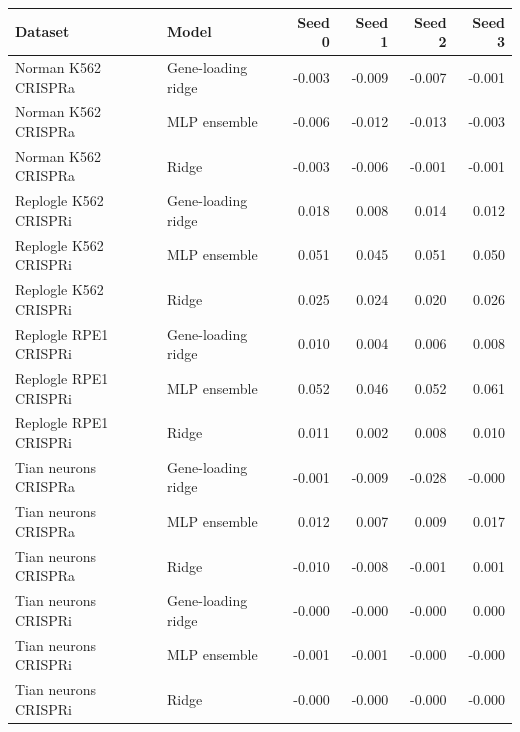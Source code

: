 \begin{tabular}{llrrrr}
\toprule
Dataset & Model & Seed 0 & Seed 1 & Seed 2 & Seed 3 \\
\midrule
Norman K562 CRISPRa & Gene-loading ridge & -0.003 & -0.009 & -0.007 & -0.001 \\
Norman K562 CRISPRa & MLP ensemble & -0.006 & -0.012 & -0.013 & -0.003 \\
Norman K562 CRISPRa & Ridge & -0.003 & -0.006 & -0.001 & -0.001 \\
Replogle K562 CRISPRi & Gene-loading ridge & 0.018 & 0.008 & 0.014 & 0.012 \\
Replogle K562 CRISPRi & MLP ensemble & 0.051 & 0.045 & 0.051 & 0.050 \\
Replogle K562 CRISPRi & Ridge & 0.025 & 0.024 & 0.020 & 0.026 \\
Replogle RPE1 CRISPRi & Gene-loading ridge & 0.010 & 0.004 & 0.006 & 0.008 \\
Replogle RPE1 CRISPRi & MLP ensemble & 0.052 & 0.046 & 0.052 & 0.061 \\
Replogle RPE1 CRISPRi & Ridge & 0.011 & 0.002 & 0.008 & 0.010 \\
Tian neurons CRISPRa & Gene-loading ridge & -0.001 & -0.009 & -0.028 & -0.000 \\
Tian neurons CRISPRa & MLP ensemble & 0.012 & 0.007 & 0.009 & 0.017 \\
Tian neurons CRISPRa & Ridge & -0.010 & -0.008 & -0.001 & 0.001 \\
Tian neurons CRISPRi & Gene-loading ridge & -0.000 & -0.000 & -0.000 & 0.000 \\
Tian neurons CRISPRi & MLP ensemble & -0.001 & -0.001 & -0.000 & -0.000 \\
Tian neurons CRISPRi & Ridge & -0.000 & -0.000 & -0.000 & -0.000 \\
\bottomrule
\end{tabular}